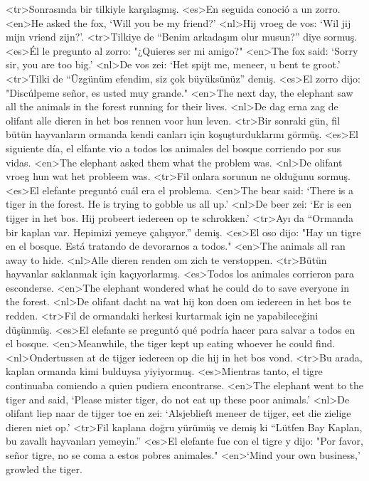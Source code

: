 <tr>Sonrasında bir tilkiyle karşılaşmış. 
<es>En seguida conoció a un zorro. 
<en>He asked the fox, `Will you be my friend?' 
<nl>Hij vroeg de vos: `Wil jij mijn vriend zijn?'.  
<tr>Tilkiye de “Benim arkadaşım olur musun?” diye sormuş. 
<es>Él le pregunto al zorro: "¿Quieres ser mi amigo?"
<en>The fox said: `Sorry sir, you are too big.' 
<nl>De vos zei: `Het spijt me, meneer, u bent te groot.'  
<tr>Tilki de “Üzgünüm efendim, siz çok büyüksünüz” demiş. 
<es>El zorro dijo: "Discúlpeme señor, es usted muy grande."
<en>The next day, the elephant saw all the animals in the forest running for their lives. 
<nl>De dag erna  zag de olifant alle dieren in het bos rennen voor hun leven. 
<tr>Bir sonraki gün, fil bütün hayvanların ormanda kendi canları için koşuşturduklarını görmüş. 
<es>El siguiente día, el elfante vio a todos los animales del bosque corriendo por sus vidas.
<en>The elephant asked them what the problem was. 
<nl>De olifant vroeg hun wat het probleem was.  
<tr>Fil onlara sorunun ne olduğunu sormuş. 
<es>El elefante preguntó cuál era el problema.
<en>The bear said: `There is a tiger in the forest. He is trying to gobble us all up.' 
<nl>De beer zei: `Er is een tijger in het bos. Hij probeert iedereen op te schrokken.'  
<tr>Ayı da “Ormanda bir kaplan var. Hepimizi yemeye çalışıyor.” demiş. 
<es>El oso dijo: "Hay un tigre en el bosque. Está tratando de devorarnos a todos."
<en>The animals  all ran away to hide. 
<nl>Alle dieren renden om zich te verstoppen.  
<tr>Bütün hayvanlar saklanmak için kaçıyorlarmış. 
<es>Todos los animales corrieron para esconderse.
<en>The elephant wondered what he could do to save everyone in the forest. 
<nl>De olifant dacht na wat hij kon doen om iedereen in het bos te redden.  
<tr>Fil de ormandaki herkesi kurtarmak için ne yapabileceğini düşünmüş. 
<es>El elefante se preguntó qué podría hacer para salvar a todos en el bosque.
<en>Meanwhile, the tiger kept up eating whoever he could find. 
<nl>Ondertussen at de tijger iedereen op die hij in het bos vond.  
<tr>Bu arada, kaplan ormanda kimi bulduysa yiyiyormuş. 
<es>Mientras tanto, el tigre continuaba comiendo a quien pudiera encontrarse.
<en>The elephant went to the tiger and said, `Please mister tiger, do not eat up these poor animals.' 
<nl>De olifant liep naar de tijger toe en zei: `Alsjeblieft meneer de tijger, eet die zielige dieren niet op.'  
<tr>Fil kaplana doğru yürümüş ve demiş ki “Lütfen Bay Kaplan, bu zavallı hayvanları yemeyin.”  
<es>El elefante fue con el tigre y dijo: "Por favor, señor tigre, no se coma a estos pobres animales."
<en>`Mind your own business,' growled the tiger. 
